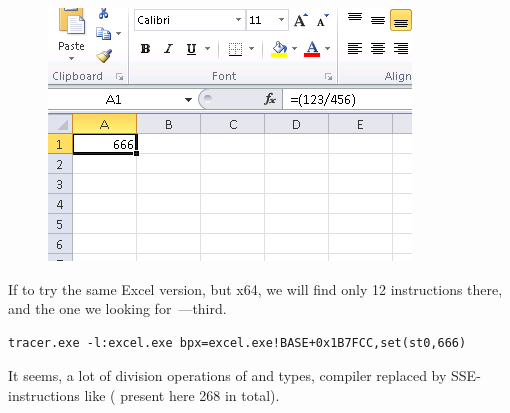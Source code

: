 \begin{figure}[H]
\centering
\includegraphics[scale=0.66]{digging_into_code/Excel_prank.png}
\caption{}
\end{figure}

{If to try the same Excel version, but x64,
we will find only 12 \FDIV instructions there,
and the one we looking for~---third.}

\begin{lstlisting}
tracer.exe -l:excel.exe bpx=excel.exe!BASE+0x1B7FCC,set(st0,666)
\end{lstlisting}

{It seems, a lot of division operations of \Tfloat and \Tdouble types, compiler replaced by SSE-instructions
like  ( present here 268 in total).}
